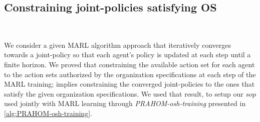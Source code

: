 \documentclass{ecai}
\newcounter{relation}
\newcounter{proof}
\begin{document}





\subsection{\textbf{Constraining joint-policies satisfying OS}}

\

We consider a given MARL algorithm approach that iteratively converges towards a joint-policy so that each agent's policy is updated at each step until a finite horizon.
We proved that constraining the available action set for each agent to the action sets authorized by the organization specifications at each step of the MARL training; implies constraining the converged joint-policies to the ones that satisfy the given organization specifications. We used that result, to setup our $sop$ used jointly with MARL learning through \emph{PRAHOM-osh-training} presented in \autoref{alg:PRAHOM-osh-training}.
\end{document}

